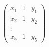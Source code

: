 \documentclass[preview]{standalone}
\begin{document}
\begin{align*}
\left(\begin{array}{cc|c} x_1 & 1 & y_1 \\ x_2 & 1 & y_2 \\ \vdots & & \\ x_5 & 1 & y_5 \end{array}\right)
\end{align*}
\end{document}
